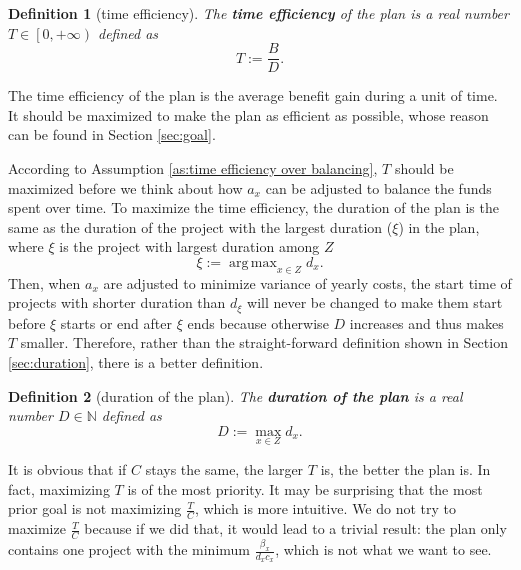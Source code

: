 \documentclass{article}
\DeclareMathOperator*{\argmax}{arg\,max}
\newtheorem{definition}{Definition}
\begin{document}
\begin{definition}[time efficiency]
The \textbf{time efficiency} of the plan is a real number $T\in\left[0,+\infty\right)$ defined as
\begin{equation}
T:=\frac BD.
\end{equation}
\end{definition}

The time efficiency of the plan is the average benefit gain during a unit of time.
It should be maximized to make the plan as efficient as possible,
whose reason can be found in Section \ref{sec:goal}.

According to Assumption \ref{as:time efficiency over balancing}, $T$ should be maximized before we think about how $a_x$ can be adjusted to balance the funds spent over time.
To maximize the time efficiency, the duration of the plan is the same as the duration of the project with the largest duration ($\xi$) in the plan,
where $\xi$ is the project with largest duration among $Z$
\begin{equation}
\xi:=\argmax_{x\in Z}d_x.
\end{equation}
Then, when $a_x$ are adjusted to minimize variance of yearly costs,
the start time of projects with shorter duration than $d_\xi$ will never be changed to make them start before $\xi$ starts or end after $\xi$ ends
because otherwise $D$ increases and thus makes $T$ smaller.
Therefore, rather than the straight-forward definition shown in Section \ref{sec:duration}, there is a better definition.

\begin{definition}[duration of the plan]
The \textbf{duration of the plan} is a real number $D\in\mathbb N$ defined as
\begin{equation}
\label{eq:duration of the plan}
D:=\max_{x\in Z}d_x.
\end{equation}
\end{definition}

It is obvious that if $C$ stays the same, the larger $T$ is, the better the plan is.
In fact, maximizing $T$ is of the most priority.
It may be surprising that the most prior goal is not maximizing $\frac TC$, which is more intuitive.
We do not try to maximize $\frac TC$ because if we did that,
it would lead to a trivial result:
the plan only contains one project with the minimum $\frac{\beta_x}{d_xc_x}$, which is not what we want to see.
\end{document}
